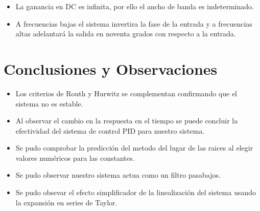 \documentclass[a4paper]{IEEEtran} %
\begin{document}
\begin{itemize}
    \item La ganancia en DC es infinita, por ello el ancho de banda es indeterminado.
    \item A frecuencias bajas el sistema invertira la fase de la entrada y a frecuencias altas adelantará la salida en noventa grados con respecto a la entrada.
\end{itemize}

\section{Conclusiones y Observaciones}
\begin{itemize}
    \item Los criterios de Routh y Hurwitz se complementan confirmando que el sistema no es estable.
    \item Al observar el cambio en la respuesta en el tiempo se puede concluir la efectividad del sistema de control PID para nuestro sistema.
    \item Se pudo comprobar la predicción del metodo del lugar de las raices al elegir valores numéricos para las constantes.
    \item Se pudo observar nuestro sistema actua como un filtro pasabajos.
    \item Se pudo obsevar el efecto simplificador de la linealización del sistema usando la expansión en series de Taylor.
\end{itemize}


\end{document}
